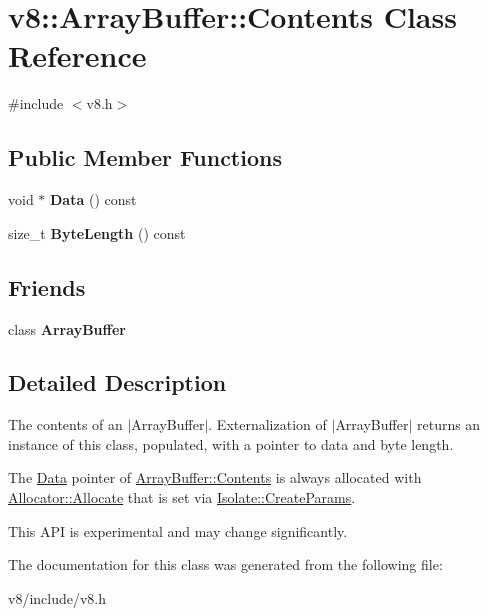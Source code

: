 \hypertarget{classv8_1_1ArrayBuffer_1_1Contents}{}\section{v8\+:\+:Array\+Buffer\+:\+:Contents Class Reference}
\label{classv8_1_1ArrayBuffer_1_1Contents}


{\ttfamily \#include $<$v8.\+h$>$}

\subsection*{Public Member Functions}
\begin{DoxyCompactItemize}
\item 
\hypertarget{classv8_1_1ArrayBuffer_1_1Contents_a9ed7556bfaca7a0b24deb05538a76dcd}{}void $\ast$ {\bfseries Data} () const \label{classv8_1_1ArrayBuffer_1_1Contents_a9ed7556bfaca7a0b24deb05538a76dcd}

\item 
\hypertarget{classv8_1_1ArrayBuffer_1_1Contents_a1b6a3eecb4fe05f4d33c83b6bc1fa737}{}size\+\_\+t {\bfseries Byte\+Length} () const \label{classv8_1_1ArrayBuffer_1_1Contents_a1b6a3eecb4fe05f4d33c83b6bc1fa737}

\end{DoxyCompactItemize}
\subsection*{Friends}
\begin{DoxyCompactItemize}
\item 
\hypertarget{classv8_1_1ArrayBuffer_1_1Contents_acbcb25033a90500a51aa19c811b2a1d3}{}class {\bfseries Array\+Buffer}\label{classv8_1_1ArrayBuffer_1_1Contents_acbcb25033a90500a51aa19c811b2a1d3}

\end{DoxyCompactItemize}


\subsection{Detailed Description}
The contents of an $\vert$\+Array\+Buffer$\vert$. Externalization of $\vert$\+Array\+Buffer$\vert$ returns an instance of this class, populated, with a pointer to data and byte length.

The \hyperlink{classv8_1_1Data}{Data} pointer of \hyperlink{classv8_1_1ArrayBuffer_1_1Contents}{Array\+Buffer\+::\+Contents} is always allocated with \hyperlink{classv8_1_1ArrayBuffer_1_1Allocator_a106b0d80120ed04fe9b9675e96f0340b}{Allocator\+::\+Allocate} that is set via \hyperlink{structv8_1_1Isolate_1_1CreateParams}{Isolate\+::\+Create\+Params}.

This A\+P\+I is experimental and may change significantly. 

The documentation for this class was generated from the following file\+:\begin{DoxyCompactItemize}
\item 
v8/include/v8.\+h\end{DoxyCompactItemize}
